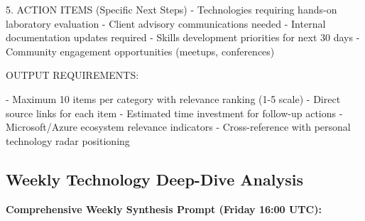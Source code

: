 \documentclass[
  letterpaper,
  DIV=11,
  numbers=noendperiod]{scrartcl}
\newenvironment{Shaded}{\begin{snugshade}}{\end{snugshade}}
\newcommand{\NormalTok}[1]{\textcolor[rgb]{0.00,0.23,0.31}{#1}}
\begin{document}
\begin{Shaded}
\begin{Highlighting}[]
\NormalTok{5. ACTION ITEMS (Specific Next Steps)}
\NormalTok{   {-} Technologies requiring hands{-}on laboratory evaluation}
\NormalTok{   {-} Client advisory communications needed}
\NormalTok{   {-} Internal documentation updates required}
\NormalTok{   {-} Skills development priorities for next 30 days}
\NormalTok{   {-} Community engagement opportunities (meetups, conferences)}

\NormalTok{OUTPUT REQUIREMENTS:}

\NormalTok{{-} Maximum 10 items per category with relevance ranking (1{-}5 scale)}
\NormalTok{{-} Direct source links for each item}
\NormalTok{{-} Estimated time investment for follow{-}up actions}
\NormalTok{{-} Microsoft/Azure ecosystem relevance indicators}
\NormalTok{{-} Cross{-}reference with personal technology radar positioning}
\end{Highlighting}
\end{Shaded}

\subsection{Weekly Technology Deep-Dive
Analysis}\label{weekly-technology-deep-dive-analysis}

\textbf{Comprehensive Weekly Synthesis Prompt (Friday 16:00 UTC):}
\end{document}
